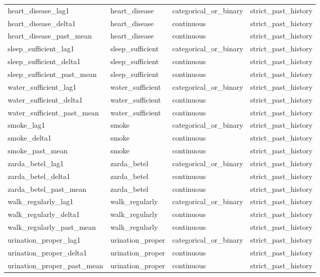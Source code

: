 \begin{longtable}{llll}
heart\_disease\_lag1 & heart\_disease & categorical\_or\_binary & strict\_past\_history \\
heart\_disease\_delta1 & heart\_disease & continuous & strict\_past\_history \\
heart\_disease\_past\_mean & heart\_disease & continuous & strict\_past\_history \\
sleep\_sufficient\_lag1 & sleep\_sufficient & categorical\_or\_binary & strict\_past\_history \\
sleep\_sufficient\_delta1 & sleep\_sufficient & continuous & strict\_past\_history \\
sleep\_sufficient\_past\_mean & sleep\_sufficient & continuous & strict\_past\_history \\
water\_sufficient\_lag1 & water\_sufficient & categorical\_or\_binary & strict\_past\_history \\
water\_sufficient\_delta1 & water\_sufficient & continuous & strict\_past\_history \\
water\_sufficient\_past\_mean & water\_sufficient & continuous & strict\_past\_history \\
smoke\_lag1 & smoke & categorical\_or\_binary & strict\_past\_history \\
smoke\_delta1 & smoke & continuous & strict\_past\_history \\
smoke\_past\_mean & smoke & continuous & strict\_past\_history \\
zarda\_betel\_lag1 & zarda\_betel & categorical\_or\_binary & strict\_past\_history \\
zarda\_betel\_delta1 & zarda\_betel & continuous & strict\_past\_history \\
zarda\_betel\_past\_mean & zarda\_betel & continuous & strict\_past\_history \\
walk\_regularly\_lag1 & walk\_regularly & categorical\_or\_binary & strict\_past\_history \\
walk\_regularly\_delta1 & walk\_regularly & continuous & strict\_past\_history \\
walk\_regularly\_past\_mean & walk\_regularly & continuous & strict\_past\_history \\
urination\_proper\_lag1 & urination\_proper & categorical\_or\_binary & strict\_past\_history \\
urination\_proper\_delta1 & urination\_proper & continuous & strict\_past\_history \\
urination\_proper\_past\_mean & urination\_proper & continuous & strict\_past\_history \\

\end{longtable}
